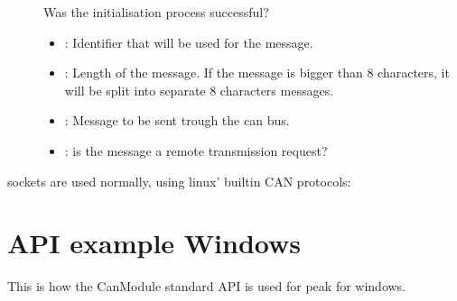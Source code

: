 \documentclass[a4paper,10pt,english]{sphinxmanual}
\begin{document}
\begin{fulllineitems}
\begin{fulllineitems}
\begin{description}
\item[{}] \leavevmode
Was the initialisation process successful? 

\item[{}] \leavevmode\begin{itemize}
\item {} 
: Identifier that will be used for the message. 

\item {} 
: Length of the message. If the message is bigger than 8 characters, it will be split into separate 8 characters messages. 

\item {} 
: Message to be sent trough the can bus. 

\item {} 
: is the message a remote transmission request? 

\end{itemize}

\end{description}


\end{fulllineitems}


\end{fulllineitems}


sockets are used normally, using linux’ built\sphinxhyphen{}in CAN protocols:

\begin{sphinxVerbatim}[commandchars=\\\{\}]
    
\end{sphinxVerbatim}


\section{API example Windows}
\label{\detokenize{vendors/peak:api-example-windows}}
This is how the CanModule standard API is used for peak for windows.
\end{document}
